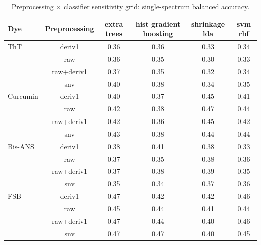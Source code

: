 \begin{table}[!htbp]
\centering\scriptsize
\caption{Preprocessing $\times$ classifier sensitivity grid: single-spectrum balanced accuracy.}\label{tab:s_preproc}
\begin{tabular}{lccccc}
\toprule
\textbf{Dye} & \textbf{Preprocessing} & \textbf{extra trees} & \textbf{hist gradient boosting} & \textbf{shrinkage lda} & \textbf{svm rbf} \\
\midrule
ThT & deriv1 & 0.36 & 0.36 & 0.33 & 0.34 \\
 & raw & 0.36 & 0.35 & 0.30 & 0.33 \\
 & raw+deriv1 & 0.37 & 0.35 & 0.32 & 0.34 \\
 & snv & 0.40 & 0.38 & 0.34 & 0.35 \\
Curcumin & deriv1 & 0.40 & 0.37 & 0.45 & 0.41 \\
 & raw & 0.42 & 0.38 & 0.47 & 0.44 \\
 & raw+deriv1 & 0.42 & 0.36 & 0.45 & 0.42 \\
 & snv & 0.43 & 0.38 & 0.44 & 0.44 \\
Bis-ANS & deriv1 & 0.38 & 0.41 & 0.38 & 0.33 \\
 & raw & 0.37 & 0.35 & 0.38 & 0.36 \\
 & raw+deriv1 & 0.37 & 0.38 & 0.39 & 0.35 \\
 & snv & 0.35 & 0.34 & 0.37 & 0.36 \\
FSB & deriv1 & 0.47 & 0.42 & 0.42 & 0.46 \\
 & raw & 0.45 & 0.44 & 0.41 & 0.44 \\
 & raw+deriv1 & 0.47 & 0.44 & 0.40 & 0.46 \\
 & snv & 0.47 & 0.47 & 0.40 & 0.45 \\
\bottomrule
\end{tabular}
\end{table}

